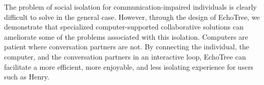 \documentclass{sigchi}
\begin{document}
The problem of social isolation for communication-impaired individuals is clearly difficult to solve in the general case. However, through the design of EchoTree, we demonstrate that specialized computer-supported collaborative solutions can ameliorate some of the problems associated with this isolation. Computers are patient where conversation partners are not. By connecting the individual, the computer, and the conversation partners in an interactive loop, EchoTree can facilitate a more efficient, more enjoyable, and less isolating experience for users such as Henry.




%
%
%
%
%
\balance


\scriptsize{}
\end{document}
